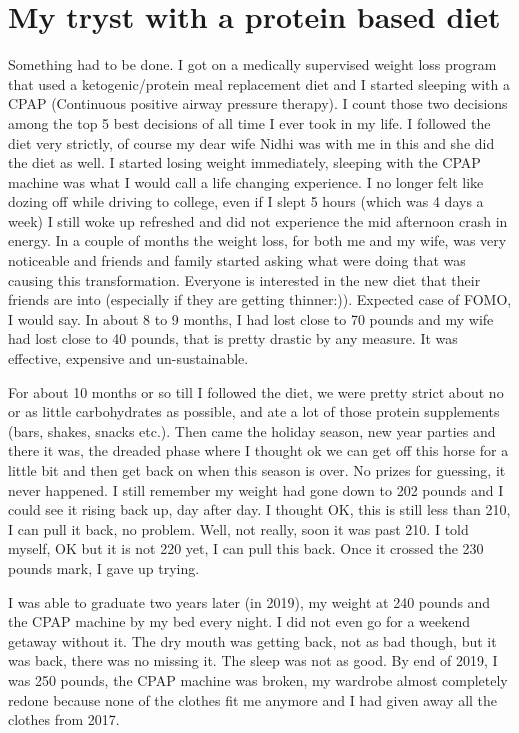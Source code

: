 \documentclass[
  oneside]{book}
\begin{document}
\hypertarget{my-tryst-with-a-protein-based-diet}{%
\section{My tryst with a protein based diet}\label{my-tryst-with-a-protein-based-diet}}

Something had to be done. I got on a medically supervised weight loss program that used a ketogenic/protein meal replacement diet and I started sleeping with a CPAP (Continuous positive airway pressure therapy). I count those two decisions among the top 5 best decisions of all time I ever took in my life. I followed the diet very strictly, of course my dear wife Nidhi was with me in this and she did the diet as well. I started losing weight immediately, sleeping with the CPAP machine was what I would call a life changing experience. I no longer felt like dozing off while driving to college, even if I slept 5 hours (which was 4 days a week) I still woke up refreshed and did not experience the mid afternoon crash in energy. In a couple of months the weight loss, for both me and my wife, was very noticeable and friends and family started asking what were doing that was causing this transformation. Everyone is interested in the new diet that their friends are into (especially if they are getting thinner:)). Expected case of FOMO, I would say. In about 8 to 9 months, I had lost close to 70 pounds and my wife had lost close to 40 pounds, that is pretty drastic by any measure. It was effective, expensive and un-sustainable.

For about 10 months or so till I followed the diet, we were pretty strict about no or as little carbohydrates as possible, and ate a lot of those protein supplements (bars, shakes, snacks etc.). Then came the holiday season, new year parties and there it was, the dreaded phase where I thought ok we can get off this horse for a little bit and then get back on when this season is over. No prizes for guessing, it never happened. I still remember my weight had gone down to 202 pounds and I could see it rising back up, day after day. I thought OK, this is still less than 210, I can pull it back, no problem. Well, not really, soon it was past 210. I told myself, OK but it is not 220 yet, I can pull this back. Once it crossed the 230 pounds mark, I gave up trying.

I was able to graduate two years later (in 2019), my weight at 240 pounds and the CPAP machine by my bed every night. I did not even go for a weekend getaway without it. The dry mouth was getting back, not as bad though, but it was back, there was no missing it. The sleep was not as good. By end of 2019, I was 250 pounds, the CPAP machine was broken, my wardrobe almost completely redone because none of the clothes fit me anymore and I had given away all the clothes from 2017.
\end{document}
